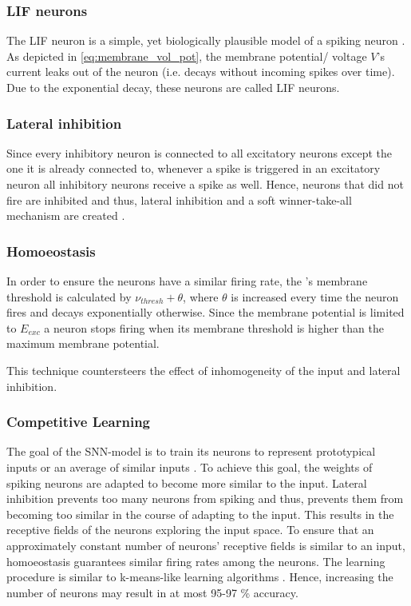 \subsubsection{\ac{LIF} neurons}
The \ac{LIF} neuron is a simple, yet biologically plausible model of a spiking neuron \cite{RBM_SNN}.
As depicted in \autoref{eq:membrane_vol_pot}, the membrane potential/ voltage $V$'s current leaks out of the neuron 
(i.e. decays without incoming spikes over time).
Due to the exponential decay, these neurons are called \ac{LIF} neurons.


\subsubsection{Lateral inhibition}
Since every inhibitory neuron is connected to all excitatory neurons except the one it is already connected to, 
whenever a spike is triggered in an excitatory neuron all inhibitory neurons receive a spike as well.
Hence, neurons that did not fire are inhibited and thus, lateral inhibition and a soft winner-take-all mechanism are created \cite{SNN}.


\subsubsection{Homoeostasis}
In order to ensure the neurons have a similar firing rate, the \eN{}'s membrane threshold is calculated by $\nu_{thresh} + \theta$, 
where $\theta$ is increased every time the neuron fires and decays exponentially otherwise.
Since the membrane potential is limited to $E_{exc}$ a neuron stops firing when its membrane threshold is higher than the maximum membrane potential.

This technique countersteers the effect of inhomogeneity of the input and lateral inhibition.


\subsubsection{Competitive Learning}
The goal of the \ac{SNN}-model is to train its neurons to represent prototypical inputs or an average of similar inputs \cite{SNN}.
To achieve this goal, the weights of spiking neurons are adapted to become more similar to the input.
Lateral inhibition prevents too many neurons from spiking and thus, prevents them from becoming too similar in the course of adapting to the input.
This results in the receptive fields of the neurons exploring the input space.
To ensure that an approximately constant number of neurons' receptive fields is similar to an input, 
homoeostasis guarantees similar firing rates among the neurons.
The learning procedure is similar to k-means-like learning algorithms \cite{SNN}.
Hence, increasing the number of neurons may result in at most 95-97 \% accuracy.


